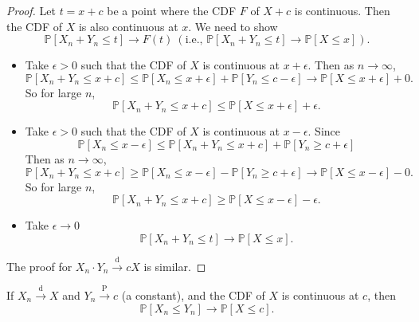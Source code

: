 \documentclass[a4paper]{article}
\begin{document}
\begin{proof}
	Let $t = x+c$ be a point where the CDF $F$ of $X+c$ is continuous. Then the CDF of $X$ is also continuous at $x$. We need to show
	\begin{equation}
		\mathbb{P}[X_n+Y_n \leq t] \to F(t) \ (\text{i.e., } \mathbb{P}[X_n+Y_n \leq t] \to \mathbb{P}[X \leq x]).
	\end{equation}
	\begin{itemize}[leftmargin=*]
		\item Take $\epsilon > 0$ such that the CDF of $X$ is continuous at $x+\epsilon$. Then as $n \to \infty$,
		\begin{equation*}
			\mathbb{P}[X_n+Y_n \leq x+c] \leq \mathbb{P}[X_n \leq x+\epsilon] + \mathbb{P}[Y_n \leq c-\epsilon] \to \mathbb{P}[X \leq x+\epsilon] + 0.
		\end{equation*}
		So for large $n$,
		\begin{equation*}
			\mathbb{P}[X_n+Y_n \leq x+c] \leq \mathbb{P}[X \leq x+\epsilon] + \epsilon.
		\end{equation*}
		\item Take $\epsilon > 0$ such that the CDF of $X$ is continuous at $x-\epsilon$. Since
		\begin{equation*}
			\mathbb{P}[X_n \leq x-\epsilon] \leq \mathbb{P}[X_n+Y_n \leq x+c] + \mathbb{P}[Y_n \geq c+\epsilon]
		\end{equation*}
		Then as $n \to \infty$,
		\begin{equation*}
			\mathbb{P}[X_n+Y_n \leq x+c] \geq \mathbb{P}[X_n \leq x-\epsilon] - \mathbb{P}[Y_n \geq c+\epsilon] \to \mathbb{P}[X \leq x-\epsilon] - 0.
		\end{equation*}
		So for large $n$,
		\begin{equation*}
			\mathbb{P}[X_n+Y_n \leq x+c] \geq \mathbb{P}[X \leq x-\epsilon] - \epsilon.
		\end{equation*}
		\item Take $\epsilon \to 0$
		\begin{equation}
			\mathbb{P}[X_n+Y_n \leq t] \to \mathbb{P}[X \leq x].
		\end{equation}
	\end{itemize}
	The proof for $X_n \cdot Y_n \stackrel{\text{d}}{\longrightarrow} cX$ is similar.
\end{proof}

\begin{cor}
	If $X_n \stackrel{\text{d}}{\longrightarrow} X$ and $Y_n \stackrel{\text{P}}{\longrightarrow} c$ (a constant), and the CDF of $X$ is continuous at $c$, then
	\begin{equation}
		\mathbb{P}[X_n \leq Y_n] \to \mathbb{P}[X \leq c].
	\end{equation}
\end{cor}
\end{document}
